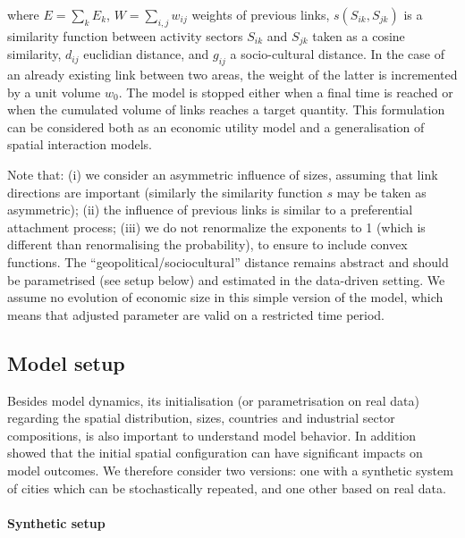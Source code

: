 \documentclass[11pt]{article}
\begin{document}
where $E  =  \sum_k E_k$, $W  = \sum_{i,j} w_{ij}$ weights of previous links, $s(S_{ik},S_{jk})$ is a similarity function between activity sectors $S_{ik}$ and $S_{jk}$ taken as a cosine similarity, $d_{ij}$ euclidian distance, and $g_{ij}$ a socio-cultural distance. In the case of an already existing link between two areas, the weight of the latter is incremented by a unit volume $w_0$. The model is stopped either when a final time is reached or when the cumulated volume of links reaches a target quantity. This formulation can be considered both as an economic utility model and a generalisation of spatial interaction models.



Note that: (i) we consider an asymmetric influence of sizes, assuming that link directions are important (similarly the similarity function $s$ may be taken as asymmetric); (ii) the influence of previous links is similar to a preferential attachment process; (iii) we do not renormalize the exponents to 1 (which is different than renormalising the probability), to ensure to include convex functions. The ``geopolitical/sociocultural'' distance remains abstract and should be parametrised (see setup below) and estimated in the data-driven setting. We assume no evolution of economic size in this simple version of the model, which means that adjusted parameter are valid on a restricted time period.


\subsection{Model setup}

Besides model dynamics, its initialisation (or parametrisation on real data) regarding the spatial distribution, sizes, countries and industrial sector compositions, is also important to understand model behavior. In addition  \cite{raimbault2019space} showed that the initial spatial configuration can have significant impacts on model outcomes. We therefore consider two versions: one with a synthetic system of cities which can be stochastically repeated, and one other based on real data.


\paragraph{Synthetic setup}
\end{document}
